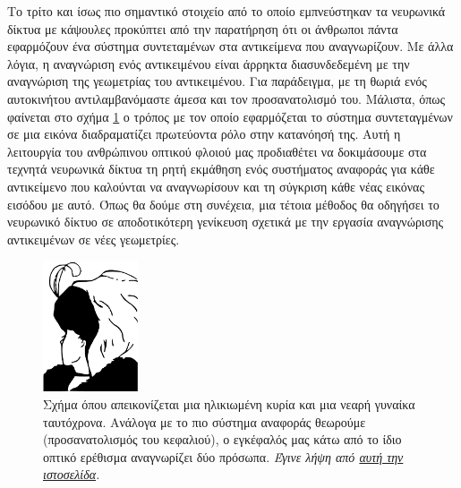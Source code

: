 Το τρίτο και ίσως πιο σημαντικό στοιχείο από το οποίο εμπνεύστηκαν τα νευρωνικά δίκτυα με κάψουλες προκύπτει από την παρατήρηση ότι οι άνθρωποι πάντα εφαρμόζουν ένα σύστημα συντεταμένων στα αντικείμενα που αναγνωρίζουν. Με άλλα λόγια, η αναγνώριση ενός αντικειμένου είναι άρρηκτα διασυνδεδεμένη με την αναγνώριση της γεωμετρίας του αντικειμένου. Για παράδειγμα, με τη θωριά ενός αυτοκινήτου αντιλαμβανόμαστε άμεσα και τον προσανατολισμό του. Μάλιστα, όπως φαίνεται στο σχήμα \ref{fig:my_wife} ο τρόπος με τον οποίο εφαρμόζεται το σύστημα συντεταγμένων σε μια εικόνα διαδραματίζει πρωτεύοντα ρόλο στην κατανόησή της. Αυτή η λειτουργία του ανθρώπινου οπτικού φλοιού μας προδιαθέτει να δοκιμάσουμε στα τεχνητά νευρωνικά δίκτυα τη ρητή εκμάθηση ενός συστήματος αναφοράς για κάθε αντικείμενο που καλούνται να αναγνωρίσουν και τη σύγκριση κάθε νέας εικόνας εισόδου με αυτό. Όπως θα δούμε στη συνέχεια, μια τέτοια μέθοδος θα οδηγήσει το νευρωνικό δίκτυο σε αποδοτικότερη γενίκευση σχετικά με την εργασία αναγνώρισης αντικειμένων σε νέες γεωμετρίες.

\begin{figure}[h]
  \centering
  \includegraphics[width=0.25\textwidth]{images/chapter theoritical background/My_wife_and_my_mother_in_law.pdf}
  \caption{Σχήμα όπου απεικονίζεται μια ηλικιωμένη κυρία και μια νεαρή γυναίκα ταυτόχρονα. Ανάλογα με το πιο σύστημα αναφοράς θεωρούμε (προσανατολισμός του κεφαλιού), ο εγκέφαλός μας κάτω από το ίδιο οπτικό ερέθισμα αναγνωρίζει δύο πρόσωπα. \textit{Έγινε λήψη από \href{https://commons.wikimedia.org/wiki/File:My_Wife_and_My_Mother-In-Law_(Hill).svg}{αυτή την ιστοσελίδα}.}} 
  \label{fig:my_wife}
\end{figure} 

